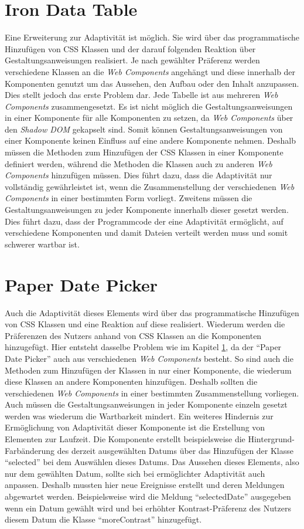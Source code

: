 \documentclass[12pt, paper=a4, bibtotoc, toc=listof, headsepline=true, numbers=endperiod]{scrreprt}
\begin{document}
	\section{Iron Data Table}
	\label{sec:evaIroDatTab}
	Eine Erweiterung zur Adaptivität ist möglich. Sie wird über das programmatische Hinzufügen von \ac{CSS} Klassen und der darauf folgenden Reaktion über Gestaltungsanweisungen realisiert. Je nach gewählter Präferenz werden verschiedene Klassen an die \emph{Web Components} angehängt und diese innerhalb der Komponenten genutzt um das Aussehen, den Aufbau oder den Inhalt anzupassen. Dies stellt jedoch das erste Problem dar. Jede Tabelle ist aus mehreren \emph{Web Components} zusammengesetzt. Es ist nicht möglich die Gestaltungsanweisungen in einer Komponente für alle Komponenten zu setzen, da \emph{Web Components} über den \emph{Shadow DOM} gekapselt sind. Somit können Gestaltungsanweisungen von einer Komponente keinen Einfluss auf eine andere Komponente nehmen. Deshalb müssen die Methoden zum Hinzufügen der \ac{CSS} Klassen in einer Komponente definiert werden, während die Methoden die Klassen auch zu anderen \emph{Web Components} hinzufügen müssen. Dies führt dazu, dass die Adaptivität nur vollständig gewährleistet ist, wenn die Zusammenstellung der verschiedenen \emph{Web Components} in einer bestimmten Form vorliegt. Zweitens müssen die Gestaltungsanweisungen zu jeder Komponente innerhalb dieser gesetzt werden. Dies führt dazu, dass der Programmcode der eine Adaptivität ermöglicht, auf verschiedene Komponenten und damit Dateien verteilt werden muss und somit schwerer wartbar ist. 
	\section{Paper Date Picker} 
	Auch die Adaptivität dieses Elements wird über das programmatische Hinzufügen von \ac{CSS} Klassen und eine Reaktion auf diese realisiert. Wiederum werden die Präferenzen des Nutzers anhand von \ac{CSS} Klassen an die Komponenten hinzugefügt. Hier entsteht dasselbe Problem wie im Kapitel \ref{sec:evaIroDatTab}, da der \enquote{Paper Date Picker} auch aus verschiedenen \emph{Web Components} besteht. So sind auch die Methoden zum Hinzufügen der Klassen in nur einer Komponente, die wiederum diese Klassen an andere Komponenten hinzufügen. Deshalb sollten die verschiedenen \emph{Web Components} in einer bestimmten Zusammenstellung vorliegen. Auch müssen die Gestaltungsanweisungen in jeder Komponente einzeln gesetzt werden was wiederum die Wartbarkeit mindert. Ein weiteres Hindernis zur Ermöglichung von Adaptivität dieser Komponente ist die Erstellung von Elementen zur Laufzeit. Die Komponente erstellt beispielsweise die Hintergrund-Farbänderung des derzeit ausgewählten Datums über das Hinzufügen der Klasse \enquote{selected} bei dem Auswählen dieses Datums. Das Aussehen dieses Elements, also nur dem gewählten Datum, sollte sich bei ermöglichter Adaptivität auch anpassen. Deshalb mussten hier neue Ereignisse erstellt und deren Meldungen abgewartet werden. Beispielsweise wird die Meldung \enquote{selectedDate} ausgegeben wenn ein Datum gewählt wird und bei erhöhter Kontrast-Präferenz des Nutzers diesem Datum die Klasse \enquote{moreContrast} hinzugefügt.
\end{document}
